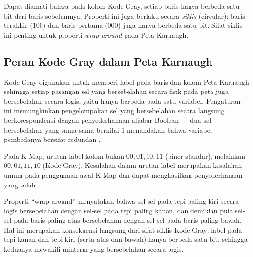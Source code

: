 Dapat diamati bahwa pada kolom Kode Gray, setiap baris hanya berbeda satu bit dari baris sebelumnya. Properti ini juga berlaku secara \textit{siklis} (circular): baris terakhir ($100$) dan baris pertama ($000$) juga hanya berbeda satu bit. Sifat siklis ini penting untuk properti \textit{wrap-around} pada Peta Karnaugh.

\subsection{Peran Kode Gray dalam Peta Karnaugh}

Kode Gray digunakan untuk memberi label pada baris dan kolom Peta Karnaugh sehingga setiap pasangan sel yang bersebelahan secara fisik pada peta juga bersebelahan secara logis, yaitu hanya berbeda pada satu variabel. Pengaturan ini memungkinkan pengelompokan sel yang bersebelahan secara langsung berkorespondensi dengan penyederhanaan aljabar Boolean --- dua sel bersebelahan yang sama-sama bernilai 1 menandakan bahwa variabel pembedanya bersifat redundan \cite{wiki_karnaugh}.

\begin{catatan}
Pada K-Map, urutan label kolom bukan $00, 01, 10, 11$ (biner standar), melainkan $00, 01, 11, 10$ (Kode Gray). Kesalahan dalam urutan label merupakan kesalahan umum pada penggunaan awal K-Map dan dapat menghasilkan penyederhanaan yang salah.
\end{catatan}

Properti ``wrap-around'' menyatakan bahwa sel-sel pada tepi paling kiri secara logis bersebelahan dengan sel-sel pada tepi paling kanan, dan demikian pula sel-sel pada baris paling atas bersebelahan dengan sel-sel pada baris paling bawah. Hal ini merupakan konsekuensi langsung dari sifat siklis Kode Gray: label pada tepi kanan dan tepi kiri (serta atas dan bawah) hanya berbeda satu bit, sehingga keduanya mewakili minterm yang bersebelahan secara logis.

